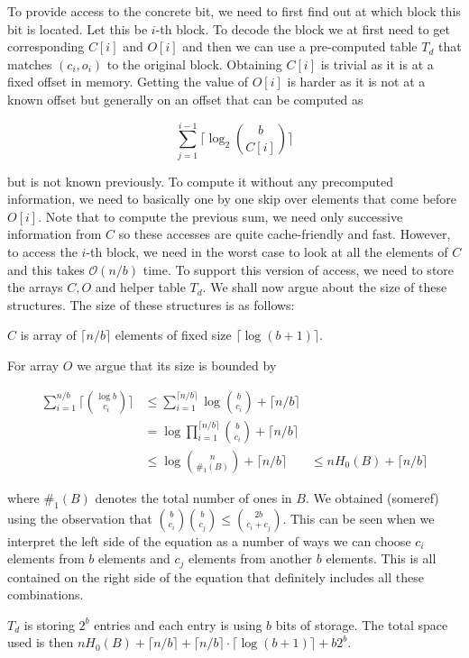 To provide access to the concrete bit, we need to first find out at which block this bit is located.
Let this be $i$-th block. To decode the block we at first need to get corresponding $C[i]$ and
$O[i]$ and then we can use a pre-computed table $T_d$ that matches $(c_i, o_i)$ to the original
block. Obtaining $C[i]$ is trivial as it is at a fixed offset in memory. Getting the value of
$O[i]$ is harder as it is not at a known offset but generally on an offset that can be computed
as

                $$\sum_{j=1}^{i-1} \lceil\log_2{b\choose C[i]}\rceil$$

but is not known previously. To compute it without any precomputed information,
we need to basically one by one skip over elements that come before $O[i]$.
Note that to compute the previous sum, we need only successive information from $C$ so these
accesses are quite cache-friendly and fast. However, to access the $i$-th block, we need in the
worst case to look at all the elements of $C$ and this takes $\mathcal{O}(n/b)$ time. To support
this version of access, we need to store the arrays $C, O$ and helper table $T_d$. We shall
now argue about the size of these structures. The size of these structures is
as follows:

$C$ is array of $\lceil n/b \rceil$ elements of fixed size $\lceil \log(b+1) \rceil$.

For array $O$ we argue that its size is bounded by

\begin{align*}
    \sum_{i=1}^{n/b} \bigg\lceil{\log b\choose c_i}\bigg\rceil
    &\leq \sum_{i=1}^{\lceil n/b \rceil} \log {b\choose c_i} + \lceil n/b \rceil \\
    &= \log\prod_{i=1}^{\lceil n/b \rceil} {b\choose c_i} + \lceil n/b \rceil \\
    &\leq \log{n\choose \#_1(B)} + \lceil n/b \rceil &\leq nH_0(B) + \lceil n/b \rceil
\end{align*}

where $\#_1(B)$ denotes the total number of ones in $B$. We obtained (someref) using the
observation that ${b\choose c_i} {b\choose c_j} \leq {2b\choose c_i+c_j}$. This can be seen
when we interpret the left side of the equation as a number of ways we can choose $c_i$ elements
from $b$ elements and $c_j$ elements from another $b$ elements. This is all contained on the
right side of the equation that definitely includes all these combinations.

$T_d$ is storing $2^b$ entries and each entry is using $b$ bits of storage.
The total space used is then $nH_0(B) + \lceil n/b \rceil + \lceil n/b \rceil \cdot \lceil \log(b+1) \rceil + b2^b$.

